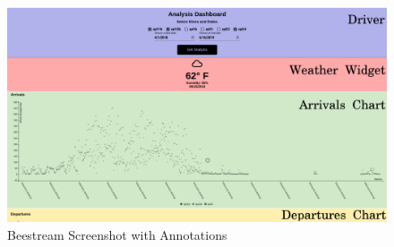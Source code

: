\begin{figure}
  \centering
  \includegraphics[width=6in]{images/beestream_screenshot_annotated.png}
  \caption{Beestream Screenshot with Annotations}
  \label{fig:beestream-screenshot-annotated}
\end{figure}
